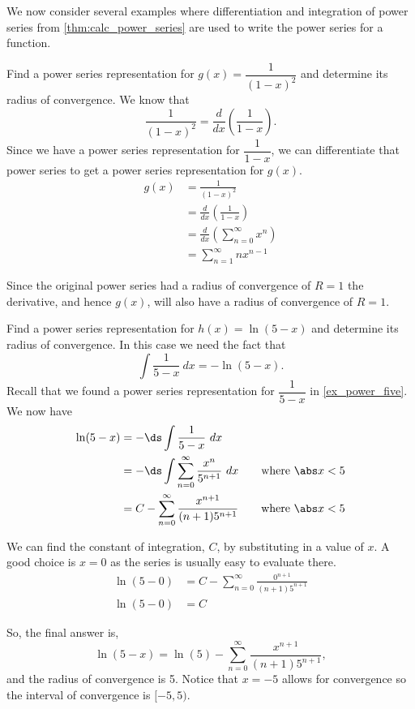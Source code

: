 We now consider several examples where differentiation and integration of power series from \autoref{thm:calc_power_series} are used to write the power series for a function. %

\begin{example}\label{ex_power_deriv}
Find a power series representation for $g(x)=\dfrac1{(1-x)^2}$ and determine its radius of convergence.
\solution
We know that
\[\frac1{(1-x)^2} = \frac{d}{dx} \left( \frac{1}{1-x} \right).\]
Since we have a power series  representation for $\dfrac1{1-x}$, we can differentiate that power series to get a power series representation for $g(x)$.  
\begin{align*}
	g(x)
	& = \frac{1}{(1-x)^2} \\
    & = \frac{d}{dx} \left( \frac{1}{1-x} \right) \\
	& =  \frac{d}{dx} \left( \sum_{n=0}^{\infty} x^n \right)\\
    & =  \sum_{n=1}^{\infty} nx^{n-1}
\end{align*}

Since the original power series had a radius of convergence of $R=1$ the derivative, and hence $g(x)$, will also have a radius of convergence of $R=1$.
\end{example}

\begin{example}\label{ex_power_int}
Find a power series representation for $h(x)=\ln(5-x)$ and determine its radius of convergence.
\solution
In this case we need the fact that
\[\int\frac1{5-x}\ dx=-\ln(5-x).\]
Recall that we found a power series representation for $\dfrac1{5-x}$ in \autoref{ex_power_five}. We now have
\begin{align*}
	\ln(5-x)
	& =  -\ds\int \frac{1}{5-x}\ dx \\
    & =  -\ds\int \sum_{n=0}^{\infty} \frac{x^n}{5^{n+1}}\ dx \qquad\text{where $\abs x<5$}\\
	& =  C - \sum_{n=0}^{\infty} \frac{x^{n+1}}{(n+1)5^{n+1}} \qquad\text{where $\abs x<5$}
\end{align*}

We can find the constant of integration, $C$, by substituting in a value of $x$.  A good choice is $x=0$ as the series is usually easy to evaluate there.  
\begin{align*}
	\ln(5-0) & = C - \sum_{n=0}^{\infty} \frac{0^{n+1}}{(n+1)5^{n+1}} \\
	\ln (5-0) & =  C 
\end{align*}

So, the final answer is, 
\[\ln(5-x) =\ln(5) - \sum_{n=0}^{\infty} \frac{x^{n+1}}{(n+1)5^{n+1}},\]
and the radius of convergence is 5. Notice that $x=-5$ allows for convergence so the interval of convergence is $[-5,5)$.
\end{example}


